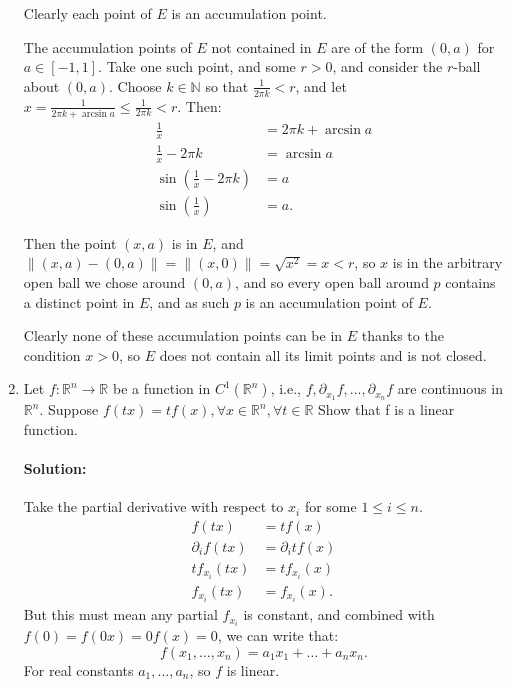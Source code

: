 \documentclass{article}
\begin{document}
\begin{enumerate}
    Clearly each point of $E$ is an accumulation point.

    The accumulation points of $E$ not contained in $E$ are of the form $(0,a)$ for $a\in [-1,1]$. Take one such point, and some $r>0$, and consider the $r$-ball about $(0,a)$. Choose $k\in \mathbb{N}$ so that $\frac{1}{2\pi k}<r$, and let $x=\frac{1}{2\pi k+\arcsin a}\leq \frac{1}{2\pi k}<r$. Then: 
    \begin{align*}
        \frac{1}{x}&= 2\pi k +\arcsin a \\
        \frac{1}{x}-2\pi k&= \arcsin a \\
        \sin\left( \frac{1}{x}-2\pi k \right) &= a \\
        \sin\left( \frac{1}{x}\right) &= a
    .\end{align*}

    Then the point $(x,a)$ is in $E$, and $\|(x,a)-(0,a)\|=\|(x,0)\|=\sqrt{x^2} =x<r$, so $x$ is in the arbitrary open ball we chose around $(0,a)$, and so every open ball around $p$ contains a distinct point in $E$, and as such $p$ is an accumulation point of $E$.

    Clearly none of these accumulation points can be in $E$ thanks to the condition $x>0$, so $E$ does not contain all its limit points and is not closed.

\item Let $f : \mathbb{R}^n \to \mathbb{R}$ be a function in $C^1(\mathbb{R}^n)$, i.e., $f, \partial_{x_1} f, ..., \partial_{x_n} f$ are continuous in $\mathbb{R}^n$. Suppose  $f(tx) = t f(x), \forall x \in \mathbb{R}^n, \forall t \in \mathbb{R}$  Show that f is a linear function.  
    \paragraph{Solution: }Take the partial derivative with respect to $x_{i}$ for some $1\leq i\leq n$.
    \begin{align*}
        f(tx)&= tf(x) \\
        \partial_if(tx)&=\partial_i tf(x) \\
        tf_{x_i}(tx)&= tf_{x_{i}}(x) \\
        f_{x_i}(tx)&= f_{x_{i}}(x)
    .\end{align*}
    But this must mean any partial $f_{x_{i}}$ is constant, and combined with $f(0)=f(0x)=0f(x)=0$, we can write that:
    \[
    f(x_1,\dots,x_n)=a_1x_1+\dots+a_nx_n
    .\] For real constants $a_1,\dots,a_n$, so $f$ is linear.


\end{enumerate}
\end{document}
